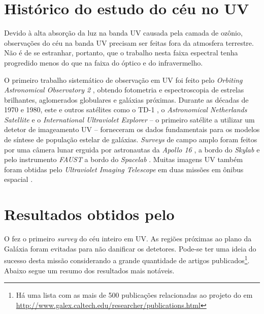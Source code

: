 \section{Histórico do estudo do céu no UV}
\label{sec:Galex:CeuUV}

Devido à alta absorção da luz na banda UV causada pela camada de ozônio,
observações do céu na banda UV precisam ser feitas fora da atmosfera terrestre.
Não é de se estranhar, portanto,  que o trabalho nesta faixa espectral tenha
progredido menos do que na faixa do óptico e do infravermelho.

O primeiro trabalho sistemático de observação em UV foi feito pelo {\em Orbiting
Astronomical Observatory 2} \citep{Code1970}, obtendo fotometria e
espectroscopia de estrelas brilhantes, aglomerados globulares e galáxias
próximas. Durante as décadas de 1970 e 1980, este e outros satélites como o TD-1
\citep{Boksenberg1973}, o {\em Astronomical Netherlands Satellite}
\citep{vanDuinen1975} e o {\em International Ultraviolet Explorer}
\citep{Kondo1987} -- o primeiro satélite a utilizar um detetor de imageamento UV
-- forneceram os dados fundamentais para os modelos de síntese de população
estelar de galáxias. {\em Surveys} de campo amplo foram feitos por uma câmera
lunar erguida por astronautas da {\em Apollo 16} \citep{Carruthers1973}, a bordo
do {\em Skylab} \citep{Henize1975} e pelo instrumento {\em FAUST} a bordo do
{\em Spacelab} \citep{Bowyer1993}. Muitas imagens UV também foram obtidas pelo
{\em Ultraviolet Imaging Telescope} em duas missões em ônibus espacial
\citep{Stecher1997}.



\section{Resultados obtidos pelo \galex}
\label{sec:Galex:Resultados}

O \galex fez o primeiro {\em survey} do céu inteiro em UV. As regiões próximas
ao plano da Galáxia foram evitadas para não danificar os detetores. Pode-se ter
uma ideia do sucesso desta missão considerando a grande quantidade de artigos
publicados\footnote{Há uma lista com as mais de 500 publicações relacionadas ao
projeto do \galex em
\url{http://www.galex.caltech.edu/researcher/publications.html}}. Abaixo segue
um resumo dos resultados mais notáveis.

